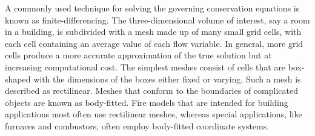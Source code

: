\documentclass[graybox]{svmult}
\begin{document}
\label{fin_diff}

A commonly used technique for solving the governing conservation equations is known as finite-differencing. The three-dimensional volume of interest, say a room in a building, is subdivided with a mesh made up of many small grid cells, with each cell containing an average value of each flow variable. In general, more grid cells produce a more accurate approximation of the true solution but at increasing computational cost. The simplest meshes consist of cells that are box-shaped with the dimensions of the boxes either fixed or varying. Such a mesh is described as rectilinear. Meshes that conform to the boundaries of complicated objects are known as body-fitted. Fire models that are intended for building applications most often use rectilinear meshes, whereas special applications, like furnaces and combustors, often employ body-fitted coordinate systems.
\end{document}

